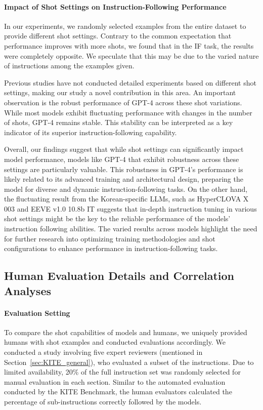     \paragraph{Impact of Shot Settings on Instruction-Following Performance}
    In our experiments, we randomly selected examples from the entire dataset to provide different shot settings. Contrary to the common expectation that performance improves with more shots, we found that in the IF task, the results were completely opposite. We speculate that this may be due to the varied nature of instructions among the examples given.

    Previous studies have not conducted detailed experiments based on different shot settings, making our study a novel contribution in this area. An important observation is the robust performance of GPT-4 across these shot variations. While most models exhibit fluctuating performance with changes in the number of shots, GPT-4 remains stable. This stability can be interpreted as a key indicator of its superior instruction-following capability.

    Overall, our findings suggest that while shot settings can significantly impact model performance, models like GPT-4 that exhibit robustness across these settings are particularly valuable. This robustness in GPT-4’s performance is likely related to its advanced training and architectural design, preparing the model for diverse and dynamic instruction-following tasks. On the other hand, the fluctuating result from the Korean-specific LLMs, such as HyperCLOVA X 003 and EEVE v1.0 10.8b IT suggests that in-depth instruction tuning in various shot settings might be the key to the reliable performance of the models' instruction following abilities. The varied results across models highlight the need for further research into optimizing training methodologies and shot configurations to enhance performance in instruction-following tasks.

    \subsection{Human Evaluation Details and Correlation Analyses}
    \label{sec:human_evals}

    \paragraph{Evaluation Setting}
    To compare the shot capabilities of models and humans, we uniquely provided humans with shot examples and conducted evaluations accordingly. We conducted a study involving five expert reviewers (mentioned in Section~\ref{sec:KITE_general}), who evaluated a subset of the instructions. Due to limited availability, 20\% of the full instruction set was randomly selected for manual evaluation in each section. Similar to the automated evaluation conducted by the KITE Benchmark, the human evaluators calculated the percentage of sub-instructions correctly followed by the models.

